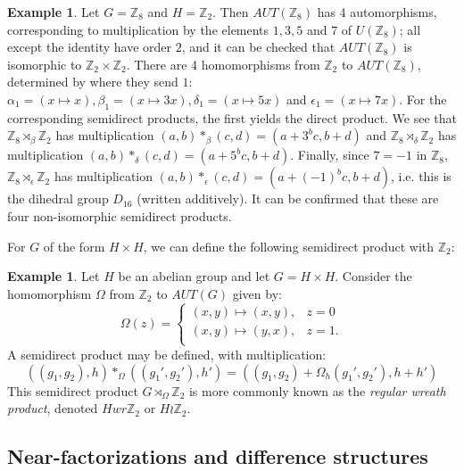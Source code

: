 \documentclass[12pt, a4paper]{article}
\theoremstyle{definition}
\newtheorem{example}[theorem]{Example}
\begin{document}
\begin{example}\label{ex:z8xz2}
Let $G=\mathbb{Z}_8$ and $H=\mathbb{Z}_2$.  Then $AUT(\mathbb{Z}_8)$ has 4 automorphisms, corresponding to multiplication by the elements $1,3,5$ and $7$ of $U(\mathbb{Z}_8)$; all except the identity have order $2$, and it can be checked that $AUT(\mathbb{Z}_8)$ is isomorphic to $\mathbb{Z}_2 \times \mathbb{Z}_2$.  There are 4 homomorphisms from $\mathbb{Z}_2$ to $AUT(\mathbb{Z}_8)$, determined by where they send $1$: $\alpha_1=(x \mapsto x), \beta_1=(x \mapsto 3x), \delta_1=(x \mapsto 5x)$ and $\epsilon_1=(x \mapsto 7x)$. For the corresponding semidirect products, the first yields the direct product.  We see that $\mathbb{Z}_8 \rtimes_{\beta} \mathbb{Z}_2$ has multiplication $(a,b) *_{\beta}(c,d)=(a+3^b c, b+d)$ and $\mathbb{Z}_8 \rtimes_{\delta} \mathbb{Z}_2$ has multiplication $(a,b) *_{\delta}(c,d)=(a+5^b c, b+d)$.  Finally, since $7=-1$ in $\mathbb{Z}_8$, $\mathbb{Z}_8 \rtimes_{\epsilon} \mathbb{Z}_2$ has multiplication $(a,b) *_{\epsilon}(c,d)=(a+(-1)^b c, b+d)$, i.e. this is the dihedral group $D_{16}$ (written additively).  It can be confirmed that these are four non-isomorphic semidirect products.
\end{example}

For $G$ of the form $H\times H$, we can define the following semidirect product with $\mathbb{Z}_2$:

\begin{example}\label{def:wreath}
Let $H$ be an abelian group and let $G=H \times H$. Consider the homomorphism $\Omega$ from $\mathbb{Z}_2$ to $AUT(G)$ given by:
    \[
    \Omega(z) = \begin{cases}
          (x,y) \mapsto (x,y), & z=0 \\
          (x,y) \mapsto (y,x), & z=1. \\
\end{cases}
    \]
A semidirect product may be defined, with multiplication:
\[ ((g_1,g_2),h) *_{\Omega} ((g_1',g_2'),h')=((g_1,g_2)+ \Omega_{h}(g_1',g_2'),h+h')\]
This semidirect product $G \rtimes_{\Omega} \mathbb{Z}_2$ is more commonly known as the \emph {regular wreath product}, denoted $H wr \mathbb{Z}_2$ or $H \wr \mathbb{Z}_2$.
\end{example}


\subsection{Near-factorizations and difference structures}
\end{document}
